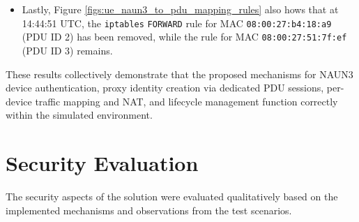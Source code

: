 \begin{itemize}
    \item Lastly, Figure \ref{figs:ue_naun3_to_pdu_mapping_rules} also hows that at 14:44:51 \ac{UTC}, the \texttt{iptables} \texttt{FORWARD} rule for \ac{MAC} \texttt{08:00:27:b4:18:a9} (\ac{PDU} ID 2) has been removed, while the rule for \ac{MAC} \texttt{08:00:27:51:7f:ef} (\ac{PDU} ID 3) remains.
\end{itemize}

These results collectively demonstrate that the proposed mechanisms for \ac{NAUN3} device authentication, proxy identity creation via dedicated \ac{PDU} sessions, per-device traffic mapping and \ac{NAT}, and lifecycle management function correctly within the simulated environment.

\section{Security Evaluation}

The security aspects of the solution were evaluated qualitatively based on the implemented mechanisms and observations from the test scenarios.

